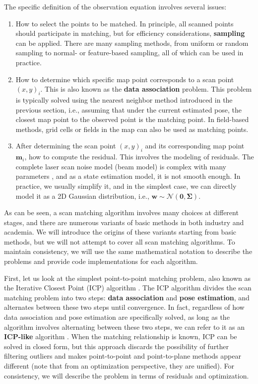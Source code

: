 The specific definition of the observation equation involves several issues:
\begin{enumerate}
	\item How to select the points to be matched. In principle, all scanned points should participate in matching, but for efficiency considerations, \textbf{sampling} can be applied. There are many sampling methods, from uniform or random sampling to normal- or feature-based sampling, all of which can be used in practice.
	\item How to determine which specific map point corresponds to a scan point $(x,y)_i$. This is also known as the \textbf{data association} problem. This problem is typically solved using the nearest neighbor method introduced in the previous section, i.e., assuming that under the current estimated pose, the closest map point to the observed point is the matching point. In field-based methods, grid cells or fields in the map can also be used as matching points.
	\item After determining the scan point $(x,y)_i$ and its corresponding map point $\bm{m}_i$, how to compute the residual. This involves the modeling of residuals. The complete laser scan noise model (beam model) is complex with many parameters \cite{Cabaleiro2015}, and as a state estimation model, it is not smooth enough. In practice, we usually simplify it, and in the simplest case, we can directly model it as a 2D Gaussian distribution, i.e., $\bm{w} \sim \mathcal{N}(\bm{0}, \boldsymbol{\Sigma})$.
\end{enumerate}

As can be seen, a scan matching algorithm involves many choices at different stages, and there are numerous variants of basic methods in both industry and academia. We will introduce the origins of these variants starting from basic methods, but we will not attempt to cover all scan matching algorithms. To maintain consistency, we will use the same mathematical notation to describe the problems and provide code implementations for each algorithm.

First, let us look at the simplest point-to-point matching problem, also known as the Iterative Closest Point (ICP) algorithm \cite{Besl1992}. The ICP algorithm divides the scan matching problem into two steps: \textbf{data association} and \textbf{pose estimation}, and alternates between these two steps until convergence. In fact, regardless of how data association and pose estimation are specifically solved, as long as the algorithm involves alternating between these two steps, we can refer to it as an \textbf{ICP-like} algorithm \cite{Koide2020,segal2009generalized,Zhang2021a}. When the matching relationship is known, ICP can be solved in closed form, but this approach discards the possibility of further filtering outliers and makes point-to-point and point-to-plane methods appear different (note that from an optimization perspective, they are unified). For consistency, we will describe the problem in terms of residuals and optimization.

